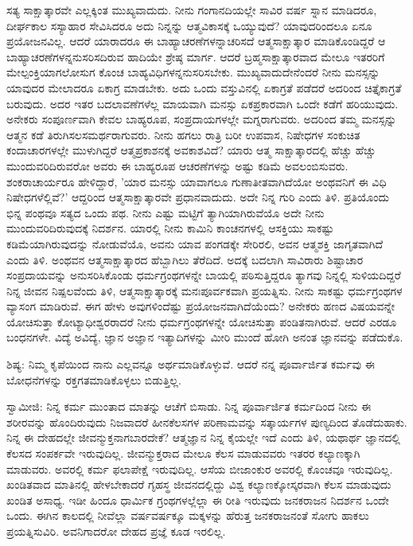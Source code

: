 ಸತ್ಯ ಸಾಕ್ಷಾತ್ಕಾರವೇ ಎಲ್ಲಕ್ಕಿಂತ ಮುಖ್ಯವಾದುದು. ನೀನು ಗಂಗಾನದಿಯಲ್ಲೇ ಸಾವಿರ ವರ್ಷ ಸ್ನಾನ ಮಾಡಿದರೂ, ದೀರ್ಘಕಾಲ ಸಸ್ಯಾಹಾರ ಸೇವಿಸಿದರೂ ಅದು ನಿನ್ನನ್ನು ಆತ್ಮವಿಕಾಸಕ್ಕೆ ಒಯ್ಯುವುದೆ? ಯಾವುದರಿಂದಲೂ ಏನೂ ಪ್ರಯೋಜನವಿಲ್ಲ. ಆದರೆ ಯಾರಾದರೂ ಈ ಬಾಹ್ಯಾಚರಣೆಗಳನ್ನಾಚರಿಸದೆ ಆತ್ಮಸಾಕ್ಷಾತ್ಕಾರ ಮಾಡಿಕೊಂಡಿದ್ದರೆ ಆ ಬಾಹ್ಯಾಚರಣೆಗಳನ್ನನುಸರಿಸದಿರುವ ಹಾದಿಯೇ ಶ್ರೇಷ್ಠ ಮಾರ್ಗ. ಆದರೆ ಬ್ರಹ್ಮಸಾಕ್ಷಾತ್ಕಾರವಾದ ಮೇಲೂ ಇತರರಿಗೆ ಮೇಲ್ಪಂಕ್ತಿಯಾಗಲೋಸುಗ ಕೊಂಚ ಬಾಹ್ಯವಿಧಿಗಳನ್ನನುಸರಿಸಬೇಕು. ಮುಖ್ಯವಾದುದೇನೆಂದರೆ ನೀನು ಮನಸ್ಸನ್ನು ಯಾವುದರ ಮೇಲಾದರೂ ಏಕಾಗ್ರ ಮಾಡಬೇಕು. ಅದು ಒಂದು ವಸ್ತುವಿನಲ್ಲಿ ಏಕಾಗ್ರತೆ ಪಡೆದರೆ ಅದರಿಂದ ಚಿತ್ತೈಕಾಗ್ರತೆ ಬರುವುದು. ಅದರ ಇತರ ಬದಲಾವಣೆಗಳೆಲ್ಲ ಮಾಯವಾಗಿ ಮನಸ್ಸು ಏಕಪ್ರಕಾರವಾಗಿ ಒಂದೇ ಕಡೆಗೆ ಹರಿಯುವುದು. ಅನೇಕರು ಸಂಪೂರ್ಣವಾಗಿ ಕೇವಲ ಬಾಹ್ಯರೂಪ, ಸಂಪ್ರದಾಯಗಳಲ್ಲೇ ಮಗ್ನರಾಗುವರು. ಅದರಿಂದ ತಮ್ಮ ಮನಸ್ಸನ್ನು ಆತ್ಮನ ಕಡೆ ತಿರುಗಿಸಲಸಮರ್ಥರಾಗುವರು. ನೀನು ಹಗಲು ರಾತ್ರಿ ಬರೀ ಉಪವಾಸ, ನಿಷೇಧಗಳ ಸಂಕುಚಿತ ಕಂದಾಚಾರಗಳಲ್ಲೇ ಮುಳುಗಿದ್ದರೆ ಆತ್ಮಪ್ರಕಾಶನಕ್ಕೆ ಅವಕಾಶವಿದೆ? ಯಾರು ಆತ್ಮ ಸಾಕ್ಷಾತ್ಕಾರದಲ್ಲಿ ಹೆಚ್ಚು ಹೆಚ್ಚು ಮುಂದುವರಿದಿರುವರೋ ಅವರು ಈ ಬಾಹ್ಯರೂಪ ಆಚರಣೆಗಳನ್ನು ಅಷ್ಟು ಕಡಿಮೆ ಅವಲಂಬಿಸುವರು. ಶಂಕರಾಚಾರ್ಯರೂ ಹೇಳಿದ್ದಾರೆ, 'ಯಾರ ಮನಸ್ಸು ಯಾವಾಗಲೂ ಗುಣಾತೀತವಾಗಿದೆಯೋ ಅಂಥವನಿಗೆ ಈ ವಿಧಿ ನಿಷೇಧಗಳೆಲ್ಲಿವೆ?' ಆದ್ದರಿಂದ ಆತ್ಮಸಾಕ್ಷಾತ್ಕಾರವೇ ಪ್ರಧಾನವಾದುದು. ಅದೇ ನಿನ್ನ ಗುರಿ ಎಂದು ತಿಳಿ. ಪ್ರತಿಯೊಂದು ಭಿನ್ನ ಪಂಥವೂ ಸತ್ಯದ ಒಂದು ಪಥ. ನೀನು ಎಷ್ಟು ಮಟ್ಟಿಗೆ ತ್ಯಾಗಿಯಾಗಿರುವೆಯೊ ಅದೇ ನೀನು ಮುಂದುವರಿದಿರುವುದಕ್ಕೆ ನಿದರ್ಶನ. ಯಾರಲ್ಲಿ ನೀನು ಕಾಮಿನಿ ಕಾಂಚನಗಳಲ್ಲಿ ಆಸಕ್ತಿಯು ಸಾಕಷ್ಟು ಕಡಿಮೆಯಾಗಿರುವುದನ್ನು ನೋಡುವೆಯೊ, ಅವನು ಯಾವ ಪಂಗಡಕ್ಕೇ ಸೇರಿರಲಿ, ಅವನ ಆತ್ಮಶಕ್ತಿ ಜಾಗೃತವಾಗಿದೆ ಎಂದು ತಿಳಿ. ಅಂಥವನ ಆತ್ಮಸಾಕ್ಷಾತ್ಕಾರದ ಹೆಬ್ಬಾಗಿಲು ತೆರೆದಿದೆ. ಅದಕ್ಕೆ ಬದಲಾಗಿ ಸಾವಿರಾರು ಶಿಷ್ಟಾಚಾರ ಸಂಪ್ರದಾಯವನ್ನು ಅನುಸರಿಸಿಕೊಂಡು ಧರ್ಮಗ್ರಂಥಗಳನ್ನೇ ಬಾಯಲ್ಲಿ ಪಠಿಸುತ್ತಿದ್ದರೂ ತ್ಯಾಗವು ನಿನ್ನಲ್ಲಿ ಸುಳಿಯದಿದ್ದರೆ ನಿನ್ನ ಜೀವನ ನಿಷ್ಪಲವೆಂದು ತಿಳಿ, ಆತ್ಮಸಾಕ್ಷಾತ್ಕಾರಕ್ಕೆ ಮನಃಪೂರ್ವಕವಾಗಿ ಪ್ರಯತ್ನಿಸು. ನೀನು ಸಾಕಷ್ಟು ಧರ್ಮಗ್ರಂಥಗಳ ವ್ಯಾಸಂಗ ಮಾಡಿರುವೆ. ಈಗ ಹೇಳು ಅವುಗಳಿಂದೆಷ್ಟು ಪ್ರಯೋಜನವಾಗಿದೆಯೆಂದು? ಅನೇಕರು ಹಣದ ವಿಷಯವನ್ನೇ ಯೋಚಿಸುತ್ತಾ ಕೋಟ್ಯಾಧೀಶ್ವರರಾದರೆ ನೀನು ಧರ್ಮಗ್ರಂಥಗಳನ್ನೇ ಯೋಚಿಸುತ್ತಾ ಪಂಡಿತನಾಗಿರುವೆ. ಆದರೆ ಎರಡೂ ಬಂಧನಗಳೇ. ವಿದ್ಯೆ ಅವಿದ್ಯೆ, ಜ್ಞಾನ ಅಜ್ಞಾನ ಇತ್ಯಾದಿಗಳನ್ನು ಮೀರಿ ಮುಂದೆ ಹೋಗಿ ಅನಂತ ಜ್ಞಾನವನ್ನು ಪಡೆದುಕೊ.

ಶಿಷ್ಯ: ನಿಮ್ಮ ಕೃಪೆಯಿಂದ ನಾನು ಎಲ್ಲವನ್ನೂ ಅರ್ಥಮಾಡಿಕೊಳ್ಳುವೆ. ಆದರೆ ನನ್ನ ಪೂರ್ವಾರ್ಜಿತ ಕರ್ಮವು ಈ ಬೋಧನೆಗಳನ್ನು ರಕ್ತಗತಮಾಡಿಕೊಳ್ಳಲು ಬಿಡುತ್ತಿಲ್ಲ.

ಸ್ವಾಮೀಜಿ: ನಿನ್ನ ಕರ್ಮ ಮುಂತಾದ ಮಾತನ್ನು ಆಚೆಗೆ ಬಿಸಾಡು. ನಿನ್ನ ಪೂರ್ವಾರ್ಜಿತ ಕರ್ಮದಿಂದ ನೀನು ಈ ಶರೀರವನ್ನು ಹೊಂದಿರುವುದು ನಿಜವಾದರೆ ಹೀನಕೆಲಸಗಳ ಪರಿಣಾಮವನ್ನು ಸತ್ಕಾರ್ಯಗಳ ಪುಣ್ಯದಿಂದ ತೊಡೆದುಹಾಕು. ನಿನ್ನ ಈ ದೇಹದಲ್ಲೇ ಜೀವನ್ಮುಕ್ತನಾಗಬಾರದೇಕೆ? ಆತ್ಮಜ್ಞಾನ ನಿನ್ನ ಕೈಯಲ್ಲೇ ಇದೆ ಎಂದು ತಿಳಿ, ಯಥಾರ್ಥ ಜ್ಞಾನದಲ್ಲಿ ಕೆಲಸದ ಸಂಪರ್ಕವೇ ಇರುವುದಿಲ್ಲ. ಜೀವನ್ಮುಕ್ತರಾದ ಮೇಲೂ ಕೆಲಸ ಮಾಡುವವರು ಇತರರ ಕಲ್ಯಾಣಕ್ಕಾಗಿ ಮಾಡುವರು. ಅವರಲ್ಲಿ ಕರ್ಮ ಫಲಾಪೇಕ್ಷೆ ಇರುವುದಿಲ್ಲ. ಆಸೆಯ ಬೀಜಾಂಕುರ ಅವರಲ್ಲಿ ಕೊಂಚವೂ ಇರುವುದಿಲ್ಲ. ಖಂಡಿತವಾದ ಮಾತಿನಲ್ಲಿ ಹೇಳಬೇಕಾದರೆ ಗೃಹಸ್ಥ ಜೀವನದಲ್ಲಿದ್ದು ವಿಶ್ವ ಕಲ್ಯಾಣಕ್ಕೋಸ್ಕರವಾಗಿ ಕೆಲಸ ಮಾಡುವುದು ಖಂಡಿತ ಅಸಾಧ್ಯ. ಇಡೀ ಹಿಂದೂ ಧಾರ್ಮಿಕ ಗ್ರಂಥಗಳಲ್ಲೆಲ್ಲಾ ಈ ರೀತಿ ಇರುವುದು ಜನಕರಾಜನ ನಿದರ್ಶನ ಒಂದೇ ಒಂದು. ಈಗಿನ ಕಾಲದಲ್ಲಿ ನೀವೆಲ್ಲಾ ವರ್ಷವರ್ಷಕ್ಕೂ ಮಕ್ಕಳನ್ನು ಹೆರುತ್ತ ಜನಕರಾಜನಂತೆ ಸೋಗು ಹಾಕಲು ಪ್ರಯತ್ನಿಸುವಿರಿ. ಅವನಿಗಾದರೋ ದೇಹದ ಪ್ರಜ್ಞೆ ಕೂಡ ಇರಲಿಲ್ಲ.

